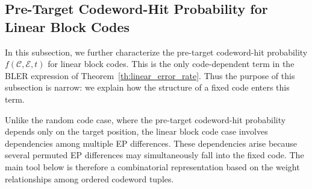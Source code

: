 \documentclass[letterpaper,draftclsnofoot,onecolumn]{IEEEtran}
\begin{document}



\subsection{Pre-Target Codeword-Hit Probability for Linear Block Codes}\label{SubSec:pre_target_hit_linear}

In this subsection, we further characterize the pre-target codeword-hit probability $f(\mathcal{C},\mathcal{E},t)$ for linear block codes. This is the only code-dependent term in the BLER expression of Theorem~\ref{th:linear_error_rate}. Thus the purpose of this subsection is narrow: we explain how the structure of a fixed code enters this term.

Unlike the random code case, where the pre-target codeword-hit probability depends only on the target position, the linear block code case involves dependencies among multiple EP differences. These dependencies arise because several permuted EP differences may simultaneously fall into the fixed code. The main tool below is therefore a combinatorial representation based on the weight relationships among ordered codeword tuples.
\end{document}
